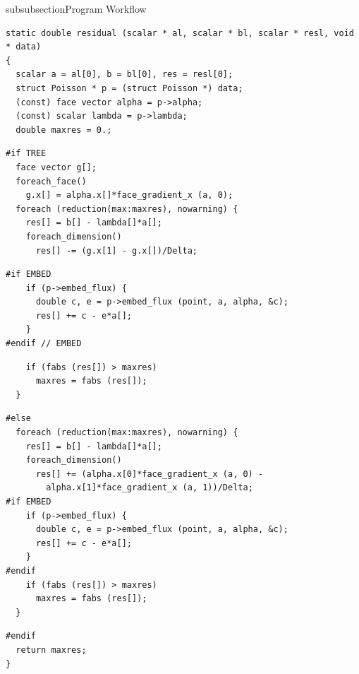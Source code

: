\begin{codesection}{subsubsection}{Program Workflow}
\begin{verbatim}
static double residual (scalar * al, scalar * bl, scalar * resl, void * data)
{
  scalar a = al[0], b = bl[0], res = resl[0];
  struct Poisson * p = (struct Poisson *) data;
  (const) face vector alpha = p->alpha;
  (const) scalar lambda = p->lambda;
  double maxres = 0.;
\end{verbatim}
\codearrow
{}
\begin{verbatim}
#if TREE
  face vector g[];
  foreach_face()
    g.x[] = alpha.x[]*face_gradient_x (a, 0);
  foreach (reduction(max:maxres), nowarning) {
    res[] = b[] - lambda[]*a[];
    foreach_dimension()
      res[] -= (g.x[1] - g.x[])/Delta;
\end{verbatim}
\codearrow
{}
\begin{verbatim}
#if EMBED
    if (p->embed_flux) {
      double c, e = p->embed_flux (point, a, alpha, &c);
      res[] += c - e*a[];
    }
#endif // EMBED 
\end{verbatim}
\codearrow
{}
\begin{verbatim}
    if (fabs (res[]) > maxres)
      maxres = fabs (res[]);
  }
\end{verbatim}
\codearrow
{}
\begin{verbatim}
#else
  foreach (reduction(max:maxres), nowarning) {
    res[] = b[] - lambda[]*a[];
    foreach_dimension()
      res[] += (alpha.x[0]*face_gradient_x (a, 0) -
		alpha.x[1]*face_gradient_x (a, 1))/Delta;  
#if EMBED
    if (p->embed_flux) {
      double c, e = p->embed_flux (point, a, alpha, &c);
      res[] += c - e*a[];
    }
#endif
    if (fabs (res[]) > maxres)
      maxres = fabs (res[]);
  }
\end{verbatim}
\codearrow
{}
\begin{verbatim}
#endif
  return maxres;
}
\end{verbatim}
\end{codesection}
\printbibliography
